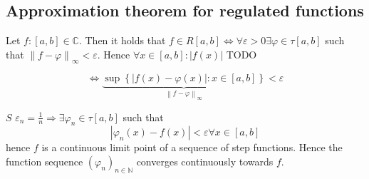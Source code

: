 \documentclass[a4paper,landscape,twocolumn]{article}
\theoremstyle{definition}
\newcommand\set[1]{\left\{#1\right\}}
\newcommand\abs[1]{\left|#1\right|}
\newcommand\norm[1]{\left\|#1\right\|}
\begin{document}
\subsection{Approximation theorem for regulated functions}

Let $f: [a,b] \in \mathbb C$. Then it holds that $f \in R[a,b] \Leftrightarrow \forall \varepsilon > 0 \exists \varphi \in \tau[a,b]$ such that $\norm{f - \varphi}_{\infty} < \varepsilon$. Hence $\forall x \in [a,b]: \abs{f(x)}$ TODO

\[ \Leftrightarrow \underbrace{\sup\set{\abs{f(x) - \varphi(x)}: x \in [a,b]}}_{\norm{f - \varphi}_{\infty}} < \varepsilon \]

$S$ $\varepsilon_n = \frac1n \Rightarrow \exists \varphi_n \in \tau[a,b]$ such that
\[ \abs{\varphi_n(x) - f(x)} < \varepsilon \forall x \in [a,b] \]
hence $f$ is a continuous limit point of a sequence of step functions.
Hence the function sequence $(\varphi_n)_{n\in\mathbb N}$ converges continuously towards $f$.
\end{document}
